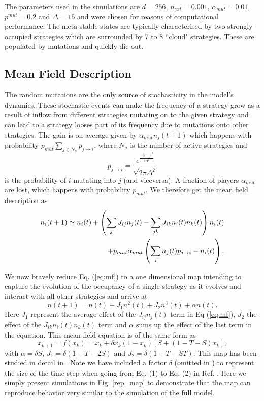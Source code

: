 \documentclass[12pt]{article}
\begin{document}
The parameters used in the simulations are $d = 256$, $n_{ext}=0.001$, $\alpha_{mut}=0.01$, $p^{mut} =0.2$ and $\Delta=15$  and were chosen for reasons of computational performance. The meta stable states are typically characterised by two strongly occupied strategies which are surrounded by 7 to 8 ``cloud" strategies. These are populated by mutations and quickly die out.  

\subsection{Mean Field Description}

The random mutations are the only source of stochasticity in the model's dynamics. These stochastic events can make the frequency of a strategy grow as a result of inflow from different strategies mutating on to the given strategy and can lead to     a strategy looses part of its frequency due to mutations onto other strategies. 
    The gain is on average given by $\alpha_{{mut}} n_j(t+1)$ which happens with probability $p_{mut}\sum_{j\in N_a} p_{j\rightarrow i}$, where $N_a$ is the number of active strategies and
\begin{equation}p_{j \rightarrow i} = \frac{e^{\frac{-|i-j|^2}{2\Delta^2}}}{\sqrt{2\pi \Delta^2}}
\end{equation}
is the probability of $i$ mutating into $j$ (and viceversa). A fraction of players $\alpha_{mut}$ are lost, which happens with probability $p_{mut}$. We therefore get the mean field description as 
\begin{eqnarray}
n_{i}(t+1)\simeq n_i(t)+\left( \sum_j J_{ij}n_j(t) - \sum_{jk}J_{ik}n_{i}(t)n_{k}(t) \right)n_i(t)\cr
 + p_{mut} \alpha_{{mut}}\left( \sum_j n_j(t) p_{j \rightarrow i } -  n_i(t) \right).
\label{eq:mf}
\end{eqnarray}

We now bravely reduce Eq. (\ref{eq:mf}) to a one dimensional map intending to capture the evolution of the occupancy of a single strategy as it evolves and interact with all other strategies and arrive at
\begin{equation}
	n(t+1) = n(t)+J_1n^2(t)+J_2n^3(t)+\alpha n(t).
\end{equation}
Here $J_1$ represent the average effect of the $J_{ij}n_j(t)$ term in Eq (\ref{eq:mf}), $J_2$ the effect of the $J_{ik}n_{i}(t)n_{k}(t) $ term and $\alpha$ sums up the effect of the last term in the equation.  This  mean field equation is of the same form as 
\begin{equation}
	x_{k+1}=f(x_k)=x_k+\delta x_k(1-x_k)[S+(1-T-S)x_k], \label{eq:replicator_map}
\end{equation}
with $\alpha=\delta S$, $J_1=\delta(1-T-2S)$ and $J_2=\delta(1-T-ST)$. This map has been studied in detail in \cite{DV_AR_AS_2011}. Note we have included a factor $\delta$ (omitted in \cite{DV_AR_AS_2011}) to represent the size of the time step when going from Eq. (1) to Eq. (2) in Ref. \cite{DV_AR_AS_2011}. Here we simply present simulations in Fig. \ref{rep_map} to demonstrate that the map can reproduce behavior very similar to the simulation of the full model. 
\end{document}
